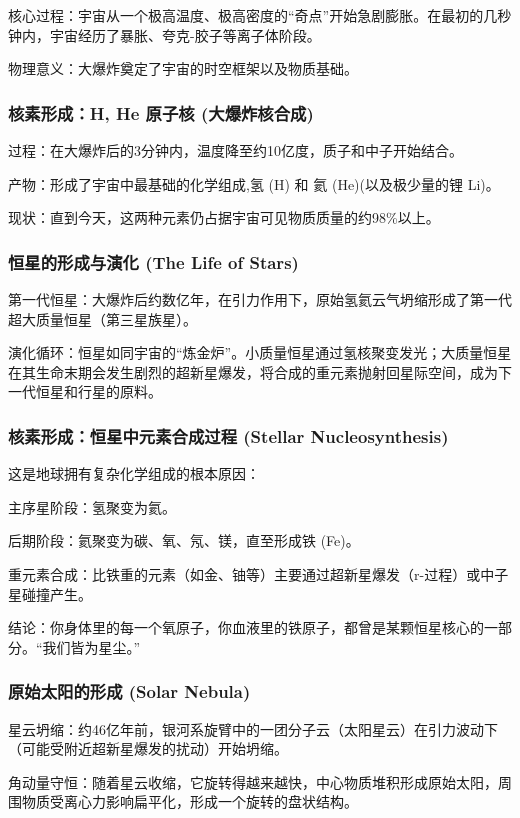 \documentclass[12pt,a4paper]{article}
\begin{document}
	核心过程：宇宙从一个极高温度、极高密度的“奇点”开始急剧膨胀。在最初的几秒钟内，宇宙经历了暴胀、夸克-胶子等离子体阶段。
	
	物理意义：大爆炸奠定了宇宙的时空框架以及物质基础。
	\subsubsection{核素形成：H, He 原子核 (大爆炸核合成)}
	
	过程：在大爆炸后的3分钟内，温度降至约10亿度，质子和中子开始结合。
	
	产物：形成了宇宙中最基础的化学组成,氢 (H) 和 氦 (He)(以及极少量的锂 Li)。
	
	现状：直到今天，这两种元素仍占据宇宙可见物质质量的约98\%以上。
	\subsubsection{恒星的形成与演化 (The Life of Stars)}
	
	第一代恒星：大爆炸后约数亿年，在引力作用下，原始氢氦云气坍缩形成了第一代超大质量恒星（第三星族星）。
	
	演化循环：恒星如同宇宙的“炼金炉”。小质量恒星通过氢核聚变发光；大质量恒星在其生命末期会发生剧烈的超新星爆发，将合成的重元素抛射回星际空间，成为下一代恒星和行星的原料。
	
	\subsubsection{核素形成：恒星中元素合成过程 (Stellar Nucleosynthesis)}
	
	这是地球拥有复杂化学组成的根本原因：
	
	主序星阶段：氢聚变为氦。
	
	后期阶段：氦聚变为碳、氧、氖、镁，直至形成铁 (Fe)。
	
	重元素合成：比铁重的元素（如金、铀等）主要通过超新星爆发（r-过程）或中子星碰撞产生。
	
	结论：你身体里的每一个氧原子，你血液里的铁原子，都曾是某颗恒星核心的一部分。“我们皆为星尘。”
	
	\subsubsection{原始太阳的形成 (Solar Nebula)}
	
	星云坍缩：约46亿年前，银河系旋臂中的一团分子云（太阳星云）在引力波动下（可能受附近超新星爆发的扰动）开始坍缩。
	
	角动量守恒：随着星云收缩，它旋转得越来越快，中心物质堆积形成原始太阳，周围物质受离心力影响扁平化，形成一个旋转的盘状结构。
	
\end{document}
